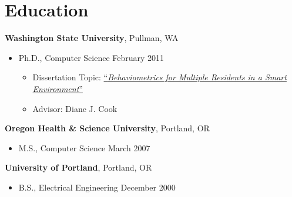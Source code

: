 \section*{Education}
\label{sec:education}
{\bf Washington State University}, Pullman, WA
\begin{itemize}
	\item Ph.D., Computer Science \hfill February 2011
	\begin{itemize}
		\item Dissertation Topic:  \href{http://gradworks.umi.com/3460369.pdf}{``\emph{Behaviometrics for Multiple Residents in a Smart Environment}''}
		\item Advisor:  Diane J. Cook
	\end{itemize}
\end{itemize}

{\bf Oregon Health \& Science University}, Portland, OR
\begin{itemize}
	\item M.S., Computer Science \hfill March 2007
\end{itemize}

{\bf University of Portland}, Portland, OR
\begin{itemize}
	\item B.S., Electrical Engineering \hfill December 2000
\end{itemize}
